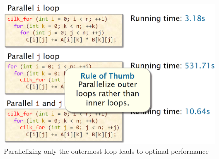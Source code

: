 \begin{figure}[htbp]
   \centering
   \includegraphics{images/02/loops_rule_of_thumb.png}
   \caption{Parallelizing only the outermost loop leads to optimal performance}
   \label{fig:loops_rule_of_thumb}
\end{figure}